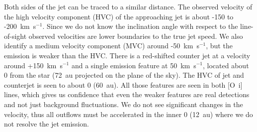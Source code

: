 \documentclass[twocolumn,trackchanges]{aastex63}
\begin{document}
Both sides of the jet can be traced to a similar distance. The observed
velocity of the high velocity component (HVC) of the approaching jet is about -150 to
-200~km~s$^{-1}$. Since we do not know the inclination angle with respect to
the line-of-sight observed velocities are lower boundaries to the true jet
speed. We also identify a medium velocity component (MVC) around -50~km~s$^{-1}$, but the emission is
weaker than the HVC. There is a red-shifted counter jet at a velocity around
+150~km~s$^{-1}$ and a single emission feature at 50~km~s$^{-1}$, located about
0 from the star (72~au projected on the plane of the sky). The HVC of
jet and counterjet is seen to about 0 (60~au). All those features are
seen in both [O~{\sc i}] lines, which gives us confidence that even the weaker
features are real detections and not just background fluctuations. We do not
see significant changes in the velocity, thus all outflows must be accelerated
in the inner 0 (12~au) where we do not resolve the jet emission.

\end{document}
